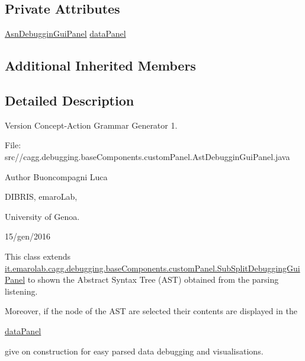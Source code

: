 \subsection*{Private Attributes}
\begin{DoxyCompactItemize}
\item 
\hyperlink{classit_1_1emarolab_1_1cagg_1_1debugging_1_1baseComponents_1_1customPanel_1_1AsnDebugginGuiPanel}{Asn\-Debuggin\-Gui\-Panel} \hyperlink{classit_1_1emarolab_1_1cagg_1_1debugging_1_1baseComponents_1_1customPanel_1_1AstDebugginGuiPanel_a2b156424a1e54aa5e4ec158ba476166f}{data\-Panel}
\end{DoxyCompactItemize}
\subsection*{Additional Inherited Members}


\subsection{Detailed Description}
\begin{DoxyVersion}{Version}
Concept-\/\-Action Grammar Generator 1. \par
 File\-: src//cagg.debugging.\-base\-Components.\-custom\-Panel.\-Ast\-Debuggin\-Gui\-Panel.\-java \par

\end{DoxyVersion}
\begin{DoxyAuthor}{Author}
Buoncompagni Luca \par
 D\-I\-B\-R\-I\-S, emaro\-Lab,\par
 University of Genoa. \par
 15/gen/2016 \par

\end{DoxyAuthor}


This class extends \hyperlink{classit_1_1emarolab_1_1cagg_1_1debugging_1_1baseComponents_1_1customPanel_1_1SubSplitDebuggingGuiPanel}{it.\-emarolab.\-cagg.\-debugging.\-base\-Components.\-custom\-Panel.\-Sub\-Split\-Debugging\-Gui\-Panel} to shown the Abstract Syntax Tree (A\-S\-T) obtained from the parsing listening.\par
 Moreover, if the node of the A\-S\-T are selected their contents are displayed in the
\begin{DoxyCode}
\hyperlink{classit_1_1emarolab_1_1cagg_1_1debugging_1_1baseComponents_1_1customPanel_1_1AstDebugginGuiPanel_a2b156424a1e54aa5e4ec158ba476166f}{dataPanel} 
\end{DoxyCode}
 give on construction for easy parsed data debugging and visualisations. 

